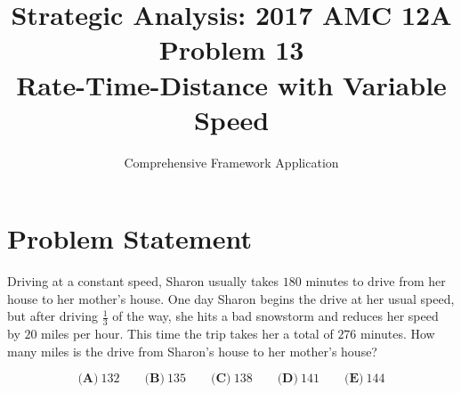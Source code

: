\documentclass[11pt]{article}
\title{\textbf{Strategic Analysis: 2017 AMC 12A Problem 13}\\\large Rate-Time-Distance with Variable Speed}
\author{Comprehensive Framework Application}
\date{}
\begin{document}
\maketitle

\section*{Problem Statement}
Driving at a constant speed, Sharon usually takes $180$ minutes to drive from her house to her mother's house. One day Sharon begins the drive at her usual speed, but after driving $\frac{1}{3}$ of the way, she hits a bad snowstorm and reduces her speed by $20$ miles per hour. This time the trip takes her a total of $276$ minutes. How many miles is the drive from Sharon's house to her mother's house?

\[\textbf{(A)}\ 132 \qquad\textbf{(B)}\ 135 \qquad\textbf{(C)}\ 138 \qquad\textbf{(D)}\ 141 \qquad\textbf{(E)}\ 144\]

\vspace{0.3cm}
\end{document}
